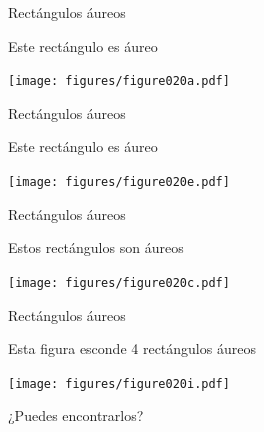 \documentclass[14pt,aspectratio=169,usenames,dvipsnames]{beamer}
\begin{document}

    \begin{frame}{Rectángulos áureos}
        \begin{center}
            Este rectángulo es áureo
        \end{center}
        \vspace{1.35em}
        \hspace{4.1em} \texttt{[image: figures/figure020a.pdf]} \\\bigskip\bigskip\bigskip\bigskip
    \end{frame}


    \begin{frame}{Rectángulos áureos}
        \begin{center}
            Este rectángulo es áureo
        \end{center}
        \vspace{1.35em}
        \hspace{4.1em} \texttt{[image: figures/figure020e.pdf]} \\\bigskip\bigskip\bigskip\bigskip
    \end{frame}


    \begin{frame}{Rectángulos áureos}
        \begin{center}
            Estos rectángulos son áureos
        \end{center}
        \vspace{1.35em}
        \hspace{3.85em} \texttt{[image: figures/figure020c.pdf]} \\\bigskip\bigskip\bigskip\bigskip
    \end{frame}


    \begin{frame}{Rectángulos áureos}
        \begin{center}
            Esta figura esconde 4 rectángulos áureos

            \bigskip\bigskip

            \texttt{[image: figures/figure020i.pdf]} \\

            \bigskip

            ¿Puedes encontrarlos?
        \end{center}
    \end{frame}
\end{document}
